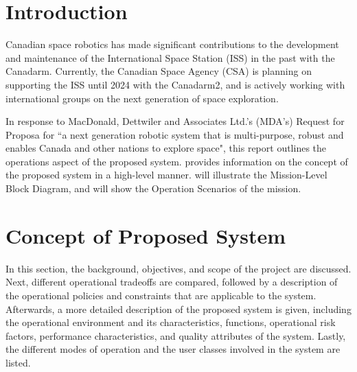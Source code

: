 \documentclass[12pt, letter]{article}
\begin{document}
\cfoot{\normalsize\thepage}
\onehalfspacing
\newpage

\newpage
\tableofcontents
\newpage
\listoffigures
\listoftables
\newpage


\clearpage
\cfoot{\normalsize\thepage}
\section{Introduction}
\label{intro}
Canadian space robotics has made significant contributions to the development and maintenance of the International Space Station (ISS) in the past with the Canadarm. Currently, the Canadian Space Agency (CSA) is planning on supporting the ISS until 2024 with the Canadarm2\cite{RFP}, and is actively working with international groups on the next generation of space exploration. 

In response to MacDonald, Dettwiler and Associates Ltd.'s (MDA's) Request for Proposa\cite{RFP} for ``a next generation robotic system that is multi-purpose, robust and enables Canada and other nations to explore space"\cite{RFP}, this report outlines the operations aspect of the proposed system.  provides information on the concept of the proposed system in a high-level manner.  will illustrate the Mission-Level Block Diagram, and  will show the Operation Scenarios of the mission.
\section{Concept of Proposed System}
\label{concept}
In this section, the background, objectives, and scope of the project are discussed. Next, different operational tradeoffs are compared, followed by a description of the operational policies and constraints that are applicable to the system. Afterwards, a more detailed description of the proposed system is given, including the operational environment and its characteristics, functions, operational risk factors, performance characteristics, and quality attributes of the system. Lastly, the different modes of operation and the user classes involved in the system are listed.
\end{document}
